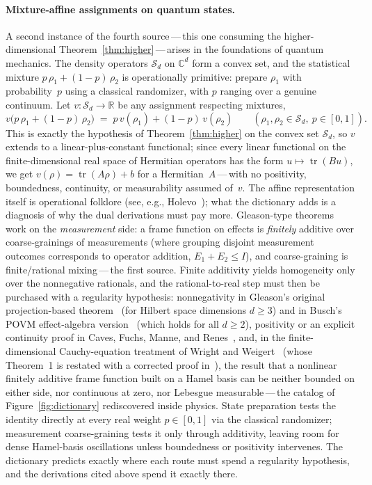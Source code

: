\documentclass{article}
\theoremstyle{plain}
\theoremstyle{definition}
\newcommand{\R}{\mathbb{R}}
\begin{document}
\paragraph{Mixture-affine assignments on quantum states.}
A second instance of the fourth source\,---\,this one consuming the
higher-dimensional Theorem~\ref{thm:higher}\,---\,arises in the
foundations of quantum mechanics. The density operators
$\mathcal{S}_d$ on $\mathbb{C}^d$ form a convex set, and the
statistical mixture $p\,\rho_1+(1-p)\,\rho_2$ is operationally
primitive: prepare $\rho_1$ with probability~$p$ using a classical
randomizer, with $p$ ranging over a genuine continuum. Let
$v\colon\mathcal{S}_d\to\R$ be any assignment respecting mixtures,
\[
v\bigl(p\,\rho_1+(1-p)\,\rho_2\bigr)\;=\;p\,v(\rho_1)+(1-p)\,v(\rho_2)
\qquad(\rho_1,\rho_2\in\mathcal{S}_d,\ p\in[0,1]).
\]
This is exactly the hypothesis of Theorem~\ref{thm:higher} on the
convex set $\mathcal{S}_d$, so $v$ extends to a linear-plus-constant
functional; since every linear functional on the finite-dimensional
real space of Hermitian operators has the form
$u\mapsto\operatorname{tr}(Bu)$, we get
$v(\rho)=\operatorname{tr}(A\rho)+b$ for a Hermitian~$A$\,---\,with
no positivity, boundedness, continuity, or measurability assumed
of~$v$. The affine representation itself is operational folklore
(see, e.g., Holevo~\cite[Lemma~1.6.1]{Holevo1982}); what the
dictionary adds is a diagnosis of why the dual derivations must pay
more. Gleason-type theorems work on the \emph{measurement} side: a
frame function on effects is \emph{finitely} additive over
coarse-grainings of measurements (where grouping disjoint measurement
outcomes corresponds to operator addition, $E_1 + E_2 \le I$), and
coarse-graining is finite/rational mixing\,---\,the first source.
Finite additivity yields homogeneity only over the nonnegative
rationals, and the rational-to-real step must then be purchased with
a regularity hypothesis: nonnegativity in Gleason's original
projection-based theorem~\cite{Gleason1957} (for Hilbert space dimensions $d \ge 3$) and in Busch's POVM effect-algebra
version~\cite{Busch2003} (which holds for all $d \ge 2$), positivity or an explicit continuity proof
in Caves, Fuchs, Manne, and Renes~\cite{CFMR2004}, and, in the
finite-dimensional Cauchy-equation treatment of Wright and
Weigert~\cite{WrightWeigert2019} (whose Theorem~1 is restated with a
corrected proof in~\cite{WrightWeigert2020}), the result that a nonlinear
finitely additive frame function built on a Hamel basis can be neither
bounded on either side, nor continuous at zero, nor Lebesgue
measurable\,---\,the catalog of Figure~\ref{fig:dictionary}
rediscovered inside physics. State
preparation tests the identity directly at every real weight
$p\in[0,1]$ via the classical randomizer; measurement coarse-graining
tests it only through additivity, leaving room for dense Hamel-basis
oscillations unless boundedness or positivity intervenes. The dictionary
predicts exactly where each route must spend a regularity hypothesis, and the
derivations cited above spend it exactly there.
\end{document}
